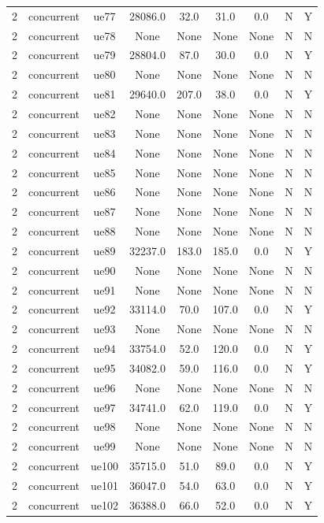 \begin{table}[ht]
\begin{tabular}{|c|c|c|c|c|c|c|c|c|}
2 & concurrent & ue77 & 28086.0 & 32.0 & 31.0 & 0.0 & N & Y \\
2 & concurrent & ue78 & None & None & None & None & N & N \\
2 & concurrent & ue79 & 28804.0 & 87.0 & 30.0 & 0.0 & N & Y \\
2 & concurrent & ue80 & None & None & None & None & N & N \\
2 & concurrent & ue81 & 29640.0 & 207.0 & 38.0 & 0.0 & N & Y \\
2 & concurrent & ue82 & None & None & None & None & N & N \\
2 & concurrent & ue83 & None & None & None & None & N & N \\
2 & concurrent & ue84 & None & None & None & None & N & N \\
2 & concurrent & ue85 & None & None & None & None & N & N \\
2 & concurrent & ue86 & None & None & None & None & N & N \\
2 & concurrent & ue87 & None & None & None & None & N & N \\
2 & concurrent & ue88 & None & None & None & None & N & N \\
2 & concurrent & ue89 & 32237.0 & 183.0 & 185.0 & 0.0 & N & Y \\
2 & concurrent & ue90 & None & None & None & None & N & N \\
2 & concurrent & ue91 & None & None & None & None & N & N \\
2 & concurrent & ue92 & 33114.0 & 70.0 & 107.0 & 0.0 & N & Y \\
2 & concurrent & ue93 & None & None & None & None & N & N \\
2 & concurrent & ue94 & 33754.0 & 52.0 & 120.0 & 0.0 & N & Y \\
2 & concurrent & ue95 & 34082.0 & 59.0 & 116.0 & 0.0 & N & Y \\
2 & concurrent & ue96 & None & None & None & None & N & N \\
2 & concurrent & ue97 & 34741.0 & 62.0 & 119.0 & 0.0 & N & Y \\
2 & concurrent & ue98 & None & None & None & None & N & N \\
2 & concurrent & ue99 & None & None & None & None & N & N \\
2 & concurrent & ue100 & 35715.0 & 51.0 & 89.0 & 0.0 & N & Y \\
2 & concurrent & ue101 & 36047.0 & 54.0 & 63.0 & 0.0 & N & Y \\
2 & concurrent & ue102 & 36388.0 & 66.0 & 52.0 & 0.0 & N & Y \\

\end{tabular}
\end{table}

